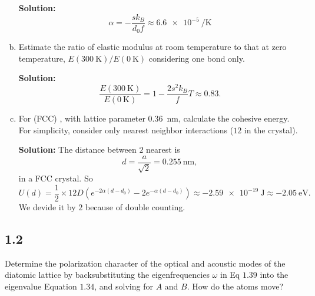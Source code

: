 \documentclass[12pt]{article}
\begin{document}
\begin{enumerate}[(a)]
	      \textbf{Solution:}
	      \begin{equation}
		      \alpha = -\frac{s k_B}{d_0 f} \approx \SI{6.6e-5}{\per\kelvin}
	      \end{equation}

	\item Estimate the ratio of elastic modulus at room temperature to that
	      at zero temperature, $E(\SI{300}{\kelvin}) / E(\SI{0}{\kelvin})$ considering one bond only.

	      \textbf{Solution:}
	      \begin{equation}
		      \frac{E(\SI{300}{\kelvin})}{E(\SI{0}{\kelvin})} = 1 - \frac{2 s^2 k_B}{f} T \approx 0.83.
	      \end{equation}

	\item For (FCC) , with lattice parameter \SI{0.36}{\nano\meter}, calculate the cohesive energy.
	      For simplicity, consider only nearest neighbor interactions ($12$ in the crystal).

	      \textbf{Solution:}
	      The distance between $2$ nearest  is
	      \begin{equation}
		      d = \frac{a}{\sqrt{2}} = \SI{0.255}{\nano\meter},
	      \end{equation}
	      in a FCC crystal. So
	      \begin{equation}
		      U(d) = \frac{1}{2} \times 12 D(e^{-2\alpha(d - d_0)} - 2e^{-\alpha (d - d_0)})
		      \approx \SI{-2.59e-19}{\joule} \approx \SI{-2.05}{\electronvolt}.
	      \end{equation}
	      We devide it by $2$ because of double counting.
\end{enumerate}

\subsection{1.2}
Determine the polarization character of the optical and acoustic modes of the diatomic
lattice by backsubstituting the eigenfrequencies $\omega$ in Eq $1.39$ into the eigenvalue
Equation $1.34$, and solving for $A$ and $B$. How do the atoms move?
\end{document}
